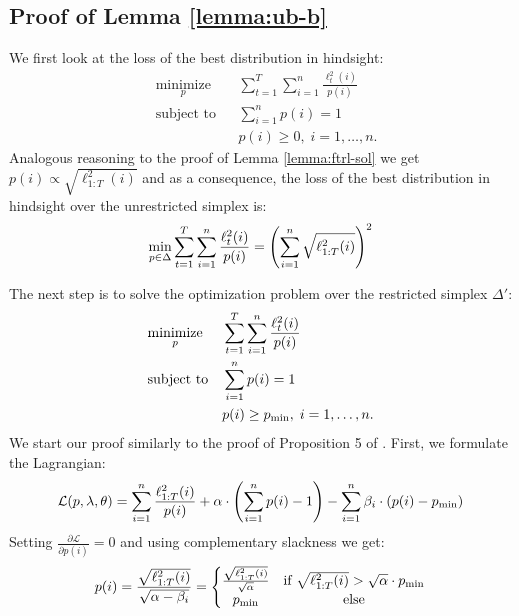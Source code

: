 \subsection{Proof of Lemma \ref{lemma:ub-b}}
\begin{proofarg}{}
We first look at the loss of the best distribution in hindsight:
\begin{equation*}
\begin{aligned}
& \underset{p}{\text{minimize}}
& & \sum_{t=1}^{T} \sum_{i=1}^n \frac{\ell_t^2(i)}{p(i)} \\
& \text{subject to}
& & \sum_{i=1}^n p(i)=1\\ 
& & &p(i) \geq 0, \; i = 1, \ldots, n.
\end{aligned}
\end{equation*}
Analogous reasoning to the proof of Lemma \ref{lemma:ftrl-sol} we get $p(i) \propto \sqrt{\ell^2_{1:T}(i)}$ and as a consequence, the loss of the best distribution in hindsight over the unrestricted simplex is:
\begin{equation} \min_{p \in \Delta} \sum_{t=1}^{T} \sum_{i=1}^n \frac{\ell_t^2(i)}{p(i)} \label{eq:ftrl-opt}
 = \left(\sum_{i=1}^n \sqrt{\ell^2_{1:T}(i)} \right)^2
\end{equation}

The next step is to solve the optimization problem over the restricted simplex $\Delta'$:
\begin{equation*}
\begin{aligned}
& \underset{p}{\text{minimize}}
& & \sum_{t=1}^{T} \sum_{i=1}^n \frac{\ell_t^2(i)}{p(i)} \\
& \text{subject to}
& & \sum_{i=1}^n p(i)=1\\ 
& & &p(i) \geq p_{\text{min}}, \; i = 1, \ldots, n.
\end{aligned}
\end{equation*}
We start our proof similarly to the proof of Proposition 5 of \cite{pmlr-v70-namkoong17a}.  First, we formulate the Lagrangian:
\begin{equation}
\mathcal{L}(p, \lambda, \theta) = \sum_{i=1}^n \frac{\ell_{1:T}^2(i) }{p(i)} + \alpha \cdot \left( \sum_{i=1}^n p(i) - 1 \right) - \sum_{i=1}^n \beta_i \cdot ( p(i) - p_{\text{min}})
\end{equation}
Setting $\frac{\partial \mathcal{L} }{ \partial p(i)} =0 $ and using complementary slackness we get:
\begin{equation} \label{eq:pi-def}
p(i)= \frac{\sqrt{\ell_{1:T}^2(i)}}{\sqrt{\alpha-\beta_i}} = 
\left\{\begin{matrix}
 \frac{\sqrt{\ell_{1:T}^2(i)}}{\sqrt{\alpha}} &  \textup{if } \sqrt{\ell_{1:T}^2(i)}>\sqrt{\alpha} \cdot p_{\text{min}} \\ 
p_{\text{min}} & \textup{else}
\end{matrix}\right.
\end{equation}


\end{proofarg}
